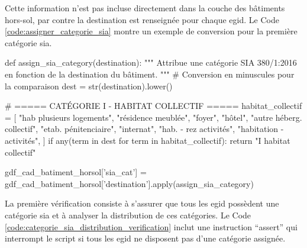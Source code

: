 \newpage
Cette information n'est pas incluse directement dans la couche des bâtiments hors-sol, par contre la destination est renseignée pour chaque \gls{egid}. Le Code \ref{code:assigner_categorie_sia} montre un exemple de conversion pour la première catégorie \gls{sia}.

\begin{code}[H]
    \begin{pythoncode}
    def assign_sia_category(destination):
        """
        Attribue une catégorie SIA 380/1:2016 en fonction de la destination du bâtiment.
        """
        # Conversion en minuscules pour la comparaison
        dest = str(destination).lower()
    
        # ===== CATÉGORIE I - HABITAT COLLECTIF =====
        habitat_collectif = [
            "hab plusieurs logements",
            "résidence meublée",
            "foyer",
            "hôtel",
            "autre héberg. collectif",
            "etab. pénitenciaire",
            "internat",
            "hab. - rez activités",
            "habitation - activités",
        ]
        if any(term in dest for term in habitat_collectif):
            return "I habitat collectif"
    
    gdf_cad_batiment_horsol['sia_cat'] = gdf_cad_batiment_horsol['destination'].apply(assign_sia_category)
    \end{pythoncode}
    \label{code:assigner_categorie_sia}
\end{code}

La première vérification consiste à s'assurer que tous les \gls{egid} possèdent une catégorie \gls{sia} et à analyser la distribution de ces catégories. Le Code \ref{code:categorie_sia_distribution_verification} inclut une instruction ``assert'' qui interrompt le script si tous les \gls{egid} ne disposent pas d'une catégorie assignée.

